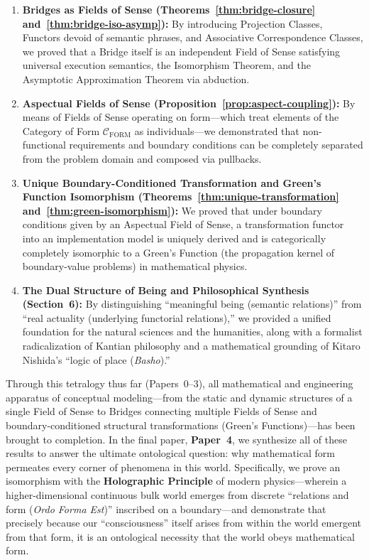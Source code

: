 \documentclass[11pt,a4paper]{article}
\theoremstyle{definition}
\theoremstyle{plain}
\theoremstyle{remark}
\newcommand{\CFORM}{\mathcal{C}_{\mathrm{FORM}}}
\begin{document}
\begin{enumerate}
    \item \textbf{Bridges as Fields of Sense (Theorems~\ref{thm:bridge-closure} and~\ref{thm:bridge-iso-asymp}):} By introducing Projection Classes, Functors devoid of semantic phrases, and Associative Correspondence Classes, we proved that a Bridge itself is an independent Field of Sense satisfying universal execution semantics, the Isomorphism Theorem, and the Asymptotic Approximation Theorem via abduction.
    \item \textbf{Aspectual Fields of Sense (Proposition~\ref{prop:aspect-coupling}):} By means of Fields of Sense operating on form---which treat elements of the Category of Form $\CFORM$ as individuals---we demonstrated that non-functional requirements and boundary conditions can be completely separated from the problem domain and composed via pullbacks.
    \item \textbf{Unique Boundary-Conditioned Transformation and Green's Function Isomorphism (Theorems~\ref{thm:unique-transformation} and~\ref{thm:green-isomorphism}):} We proved that under boundary conditions given by an Aspectual Field of Sense, a transformation functor into an implementation model is uniquely derived and is categorically completely isomorphic to a Green's Function (the propagation kernel of boundary-value problems) in mathematical physics.
    \item \textbf{The Dual Structure of Being and Philosophical Synthesis (Section~6):} By distinguishing ``meaningful being (semantic relations)'' from ``real actuality (underlying functorial relations),'' we provided a unified foundation for the natural sciences and the humanities, along with a formalist radicalization of Kantian philosophy and a mathematical grounding of Kitaro Nishida's ``logic of place (\emph{Basho}).''
\end{enumerate}

Through this tetralogy thus far (Papers~0--3), all mathematical and engineering apparatus of conceptual modeling---from the static and dynamic structures of a single Field of Sense to Bridges connecting multiple Fields of Sense and boundary-conditioned structural transformations (Green's Functions)---has been brought to completion. In the final paper, \textbf{Paper~4}, we synthesize all of these results to answer the ultimate ontological question: why mathematical form permeates every corner of phenomena in this world. Specifically, we prove an isomorphism with the \textbf{Holographic Principle} of modern physics---wherein a higher-dimensional continuous bulk world emerges from discrete ``relations and form (\emph{Ordo Forma Est})'' inscribed on a boundary---and demonstrate that precisely because our ``consciousness'' itself arises from within the world emergent from that form, it is an ontological necessity that the world obeys mathematical form.
\end{document}
